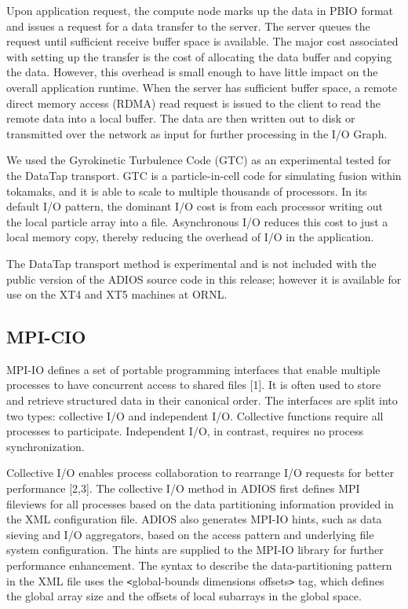 Upon application request, the compute node marks up the data in PBIO format and 
issues a request for a data transfer to the server. The server queues the request 
until sufficient receive buffer space is available. The major cost associated with 
setting up the transfer is the cost of allocating the data buffer and copying the 
data. However, this overhead is small enough to have little impact on the overall 
application runtime. When the server has sufficient buffer space, a remote direct 
memory access (RDMA) read request is issued to the client to read the remote data 
into a local buffer. The data are then written out to disk or transmitted over 
the network as input for further processing in the I/O Graph. 

We used the Gyrokinetic Turbulence Code (GTC) as an experimental tested for the 
DataTap transport. GTC is a particle-in-cell code for simulating fusion within 
tokamaks, and it is able to scale to multiple thousands of processors. In its default 
I/O pattern, the dominant I/O cost is from each processor writing out the local 
particle array into a file. Asynchronous I/O reduces this cost to just a local 
memory copy, thereby reducing the overhead of I/O in the application.

The DataTap transport method is experimental and is not included with the public 
version of the ADIOS source code in this release; however it is available for use 
on the XT4 and XT5 machines at ORNL.



\subsection{MPI-CIO}

MPI-IO defines a set of portable programming interfaces that enable multiple processes 
to have concurrent access to shared files [1]. It is often used to store and retrieve 
structured data in their canonical order. The interfaces are split into two types: 
collective I/O and independent I/O. Collective functions require all processes 
to participate. Independent I/O, in contrast, requires no process synchronization.

Collective I/O enables process collaboration to rearrange I/O requests for better 
performance [2,3]. The collective I/O method in ADIOS first defines MPI fileviews 
for all processes based on the data partitioning information provided in the XML 
configuration file. ADIOS also generates MPI-IO hints, such as data sieving and 
I/O aggregators, based on the access pattern and underlying file system configuration. 
The hints are supplied to the MPI-IO library for further performance enhancement. 
The syntax to describe the data-partitioning pattern in the XML file uses the \texttt{<}global-bounds 
dimensions offsets\texttt{>} tag, which defines the global array size and the offsets 
of local subarrays in the global space. 

